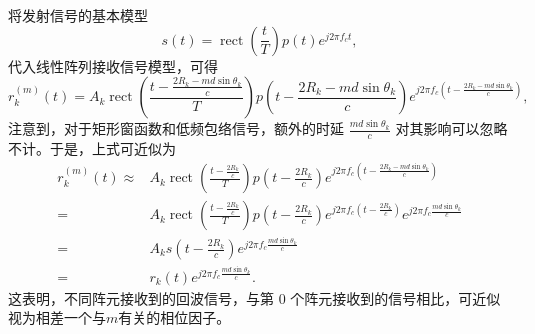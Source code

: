 将发射信号的基本模型
\[
    s(t) = \operatorname{rect}\left(\frac{t}{T}\right) p(t) e^{j 2 \pi f_c t},
\]
代入线性阵列接收信号模型，可得
\[
    r_k^{(m)}(t) = A_k \operatorname{rect}\left(\frac{t - \frac{2 R_k - m d \sin\theta_k}{c}}{T}\right)
    p\left(t - \frac{2 R_k - m d \sin\theta_k}{c}\right)
    e^{j 2 \pi f_c \left(t - \frac{2 R_k - m d \sin\theta_k}{c}\right)},
\]
注意到，对于矩形窗函数和低频包络信号，额外的时延 $\frac{m d \sin\theta_k}{c}$ 对其影响可以忽略不计。于是，上式可近似为
\[
    \begin{split}
        r_k^{(m)}(t) \approx & A_k \operatorname{rect}\left(\frac{t - \frac{2 R_k}{c}}{T}\right)
        p\left(t - \frac{2 R_k}{c}\right)
        e^{j 2 \pi f_c \left(t - \frac{2 R_k - m d \sin\theta_k}{c}\right)}                      \\
        =                    & A_k \operatorname{rect}\left(\frac{t - \frac{2 R_k}{c}}{T}\right)
        p\left(t - \frac{2 R_k}{c}\right)
        e^{j 2 \pi f_c \left(t - \frac{2 R_k}{c}\right)}
        e^{j 2 \pi f_c \frac{m d \sin\theta_k}{c}}                                               \\
        =                    & A_k s\left(t - \frac{2 R_k}{c}\right)
        e^{j 2 \pi f_c \frac{m d \sin\theta_k}{c}}                                               \\
        =                    & r_k(t) e^{j 2 \pi f_c \frac{m d \sin\theta_k}{c}}.
    \end{split}
\]
这表明，不同阵元接收到的回波信号，与第 0 个阵元接收到的信号相比，可近似视为相差一个与\( m \)有关的相位因子。

